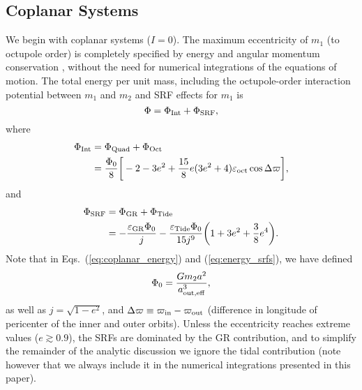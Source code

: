 \documentclass[12pt,useAMS, usenatbib]{mn2e}
\newcommand{\be}{\begin{equation}}
\newcommand{\ee}{\end{equation}}
\newcommand{\In}{{\rm in}}
\newcommand{\Out}{{\rm out}}
\newcommand{\oct}{{\rm oct}}
\newcommand{\tide}{\rm Tide}
\newcommand{\aouteff}{a_{\rm out,eff}}
\newcommand{\gr}{\rm GR}
\begin{document}
\subsection{Coplanar Systems}
\label{sec:coplanar}
We begin with coplanar systems ($I = 0$). The maximum eccentricity of $m_1$ (to octupole order) is completely specified by energy and angular momentum conservation \citep{lee2003}, without the need for numerical integrations of the equations of motion.  The total energy per unit mass, including the octupole-order interaction potential between $m_1$ and $m_2$ and SRF effects for $m_1$ is
\be
\Phi = \Phi_{\rm Int} + \Phi_{\rm SRF},
\label{eq:Phi}
\ee
where
\be
\begin{split}
\Phi_{\rm Int} & = \Phi_{\rm Quad} + \Phi_{\rm Oct} \\
& = \frac{\Phi_0}{8} \bigg[ -2 - 3 e^2 + \frac{15}{8} e (3 e^2 + 4) \varepsilon_\oct \cos \Delta \varpi \bigg],
\label{eq:coplanar_energy}
\end{split}
\ee
and
\be
\begin{split}
\Phi_{\rm SRF} & = \Phi_{\gr} + \Phi_{\tide} \\
& = - \frac{\varepsilon_{\gr} \Phi_0}{j}  - \frac{\varepsilon_{\tide} \Phi_0}{15 j^9} \bigg(1 + 3 e^2 + \frac{3}{8} e^4 \bigg).
\label{eq:energy_srfs}
\end{split}
\ee
Note that in Eqs.~(\ref{eq:coplanar_energy}) and (\ref{eq:energy_srfs}), we have defined
\be
\Phi_0 = \frac{G m_2 a^2}{\aouteff^3},
\ee
as well as $j = \sqrt{1 - e^2}$, and $\Delta \varpi \equiv \varpi_\In - \varpi_\Out$ (difference in longitude of pericenter of the inner and outer orbits).
Unless the eccentricity reaches extreme values ($e \gtrsim 0.9$), the SRFs are dominated by the GR contribution, and to simplify the remainder of the analytic discussion we ignore the tidal contribution (note however that we always include it in the numerical integrations presented in this paper). 
\end{document}
